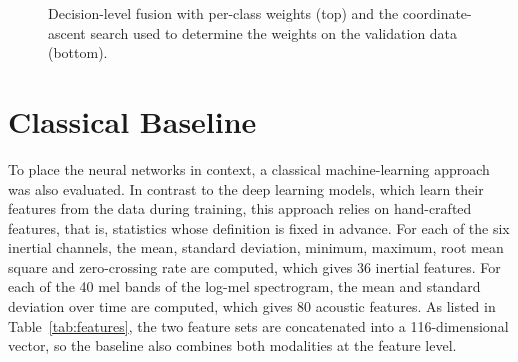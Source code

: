 \begin{figure}[htbp]
\centering
{}
\caption{Decision-level fusion with per-class weights (top) and the coordinate-ascent
search used to determine the weights on the validation data (bottom).}
\label{fig:perclass-fusion}
\end{figure}

\section{Classical Baseline}
\label{sec:classical}

To place the neural networks in context, a classical machine-learning approach was
also evaluated. In contrast to the deep learning models, which learn their
features from the data during training, this approach relies on hand-crafted
features, that is, statistics whose definition is fixed in advance. For each of
the six inertial channels, the mean, standard deviation, minimum, maximum, root
mean square and zero-crossing rate are computed, which gives 36 inertial
features. For each of the 40 mel bands of the log-mel spectrogram, the mean and
standard deviation over time are computed, which gives 80 acoustic features. As
listed in Table~\ref{tab:features}, the two feature sets are concatenated into a
116-dimensional vector, so the baseline also combines both modalities at the
feature level.

